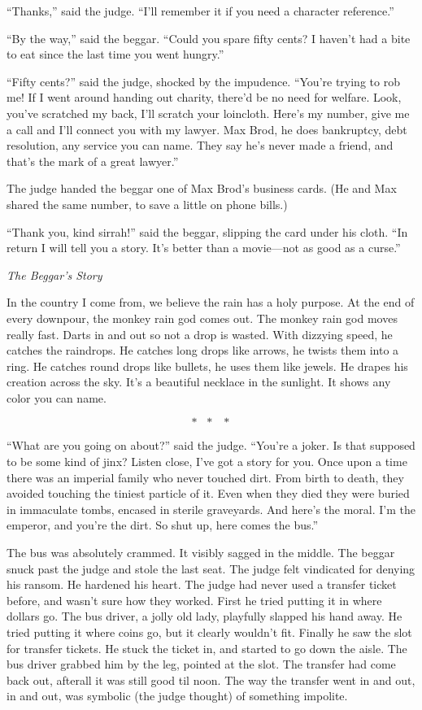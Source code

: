 \documentclass[oneside]{book}
\begin{document}
``Thanks,'' said the judge.  ``I'll remember it if you
need a character reference.''

``By the way,'' said the beggar.  ``Could you spare fifty cents?
I haven't had a bite to eat since the last time you went hungry.''

``Fifty cents?'' said the judge, shocked by the impudence.
``You're trying to rob me!
If I went around handing out charity, there'd be no need for welfare.
Look, you've scratched my back, I'll scratch your loincloth.  Here's my number,
give me a call and I'll connect you with my lawyer.  Max Brod, he
does bankruptcy, debt resolution, any service you can name.  They say he's never
made a friend, and that's the mark of a great lawyer.''

The judge handed the beggar one of Max Brod's business cards.
(He and Max shared the same number, to save a little on phone bills.)

``Thank you, kind sirrah!'' said the beggar, slipping the card under his
cloth.  ``In return I will tell you a story.  It's better than a movie---not as good as a curse.''

\vspace{2mm}
\noindent \textit{The Beggar's Story}
\vspace{2mm}

In the country I come from, we believe the rain has a holy purpose.
At the end of every downpour, the monkey rain god comes out.
The monkey rain god moves really fast.  Darts in and out so not
a drop is wasted.  With dizzying speed, he catches the raindrops.
He catches long drops like arrows, he twists them into a ring.
He catches round drops like bullets, he uses them like jewels.
He drapes his creation across the sky.  It's a beautiful necklace in
the sunlight.  It shows any color you can name.

\[*\mbox{ }*\mbox{ }*\]

``What are you going on about?'' said the judge.  ``You're a joker.
Is that supposed to be some kind of jinx?  Listen close, I've got a story for you.
Once upon a time there was an imperial family who never touched dirt.  From birth
to death, they avoided touching the tiniest particle of it.  Even when they died they
were buried in immaculate tombs, encased in sterile graveyards.  And here's the moral.
I'm the emperor, and you're the dirt.  So shut up, here comes the bus.''

The bus was absolutely crammed.  It visibly sagged in the middle.
The beggar snuck past the judge and stole the last
seat.  The judge felt vindicated for denying his ransom.  He hardened his heart.
The judge had never used a transfer ticket before, and wasn't sure how they worked.
First he tried putting it in where dollars go.  The bus driver, a jolly old lady,
playfully slapped his hand away.  He tried putting it where coins go, but it clearly wouldn't
fit.  Finally he saw the slot for transfer tickets.  He stuck the ticket in, and started to
go down the aisle.  The bus driver grabbed him by the leg, pointed at the slot.  The transfer
had come back out, afterall it was still good til noon.  The way the transfer went in and out,
in and out, was symbolic (the judge thought) of something impolite.
\end{document}
